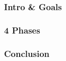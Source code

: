 \begin{frame}
    \frametitle{Intro \& Goals}
    \vspace*{\fill}

    \vspace*{\fill}
\end{frame}

\begin{frame}
    \frametitle{4 Phases}
    \vspace*{\fill}

    \vspace*{\fill}
\end{frame}

\begin{frame}
    \frametitle{Conclusion}
    \vspace*{\fill}

    \vspace*{\fill}
\end{frame}